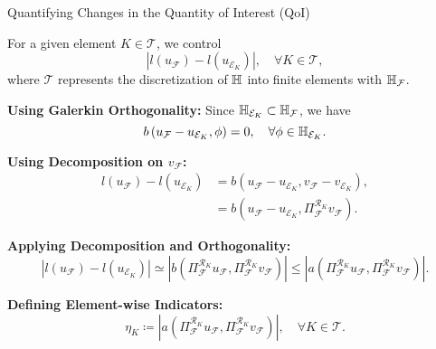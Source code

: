 \begin{frame}{Quantifying Changes in the Quantity of Interest (QoI)}

  For a given element \( K \in \mathcal{T} \), we control 
  \[
    \left| l\left(u_{\mathcal{F}}\right) - l\left(u_{\mathcal{E}_K}\right) \right|, \quad \forall K \in \mathcal{T},
  \]
  where \( \mathcal{T} \) represents the discretization of \( \mathbb{H} \) into finite elements with \( \mathbb{H}_{\mathcal{F}} \). 

  \textbf{Using Galerkin Orthogonality:}
  Since \( \mathbb{H}_{\mathcal{E}_K} \subset \mathbb{H}_{\mathcal{F}} \), we have
  \begin{equation}
    b\left(u_{\mathcal{F}} - u_{\mathcal{E}_K}, \phi\right) = 0, \quad \forall \phi \in \mathbb{H}_{\mathcal{E}_K}.
  \end{equation}

  \textbf{Using Decomposition on \( v_{\mathcal{F}} \):}
  \begin{align}
    l\left(u_{\mathcal{F}}\right) - l\left(u_{\mathcal{E}_K}\right) & = b\left(u_{\mathcal{F}} - u_{\mathcal{E}_K}, v_{\mathcal{F}} - v_{\mathcal{E}_K}\right), \\
    & = b\left(u_{\mathcal{F}} - u_{\mathcal{E}_K}, \Pi_{\mathcal{F}}^{\mathcal{R}_K} v_{\mathcal{F}}\right).
  \end{align}

  \textbf{Applying Decomposition and Orthogonality:}
  \begin{equation}
    \left| l\left(u_{\mathcal{F}}\right) - l\left(u_{\mathcal{E}_K}\right) \right| \simeq \left| b\left(\Pi_{\mathcal{F}}^{\mathcal{R}_K} u_{\mathcal{F}}, \Pi_{\mathcal{F}}^{\mathcal{R}_K} v_{\mathcal{F}}\right) \right|
    \leq \left| a\left(\Pi_{\mathcal{F}}^{\mathcal{R}_K} u_{\mathcal{F}}, \Pi_{\mathcal{F}}^{\mathcal{R}_K} v_{\mathcal{F}}\right) \right|.
  \end{equation}

  \textbf{Defining Element-wise Indicators:}
  \begin{equation}
    \eta_K \coloneqq \left| a\left(\Pi_{\mathcal{F}}^{\mathcal{R}_K} u_{\mathcal{F}}, \Pi_{\mathcal{F}}^{\mathcal{R}_K} v_{\mathcal{F}}\right) \right|, \quad \forall K \in \mathcal{T}.
  \end{equation}

\end{frame}

